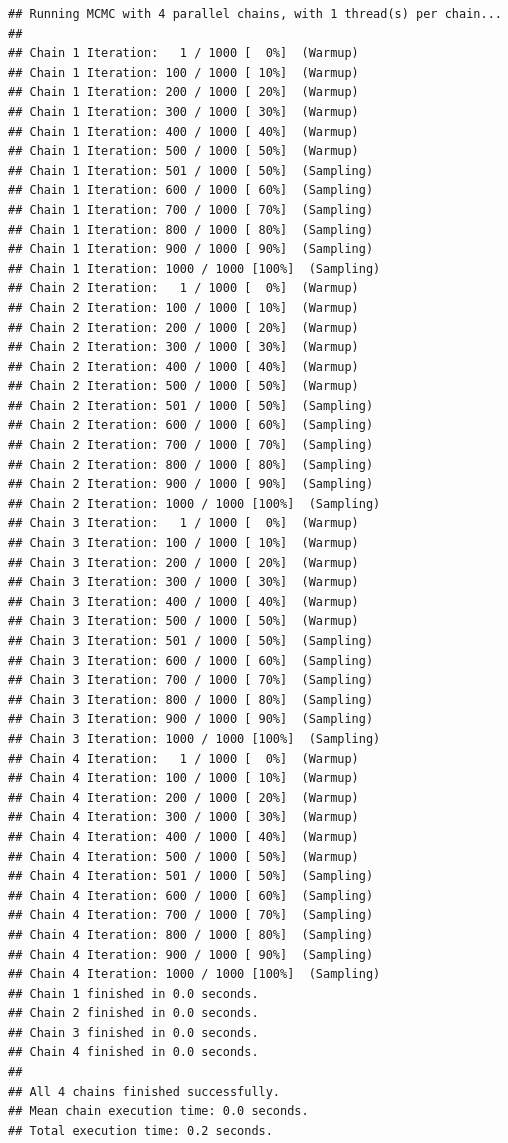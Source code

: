 \documentclass[
]{article}
\begin{document}
\begin{verbatim}
## Running MCMC with 4 parallel chains, with 1 thread(s) per chain...
## 
## Chain 1 Iteration:   1 / 1000 [  0%]  (Warmup) 
## Chain 1 Iteration: 100 / 1000 [ 10%]  (Warmup) 
## Chain 1 Iteration: 200 / 1000 [ 20%]  (Warmup) 
## Chain 1 Iteration: 300 / 1000 [ 30%]  (Warmup) 
## Chain 1 Iteration: 400 / 1000 [ 40%]  (Warmup) 
## Chain 1 Iteration: 500 / 1000 [ 50%]  (Warmup) 
## Chain 1 Iteration: 501 / 1000 [ 50%]  (Sampling) 
## Chain 1 Iteration: 600 / 1000 [ 60%]  (Sampling) 
## Chain 1 Iteration: 700 / 1000 [ 70%]  (Sampling) 
## Chain 1 Iteration: 800 / 1000 [ 80%]  (Sampling) 
## Chain 1 Iteration: 900 / 1000 [ 90%]  (Sampling) 
## Chain 1 Iteration: 1000 / 1000 [100%]  (Sampling) 
## Chain 2 Iteration:   1 / 1000 [  0%]  (Warmup) 
## Chain 2 Iteration: 100 / 1000 [ 10%]  (Warmup) 
## Chain 2 Iteration: 200 / 1000 [ 20%]  (Warmup) 
## Chain 2 Iteration: 300 / 1000 [ 30%]  (Warmup) 
## Chain 2 Iteration: 400 / 1000 [ 40%]  (Warmup) 
## Chain 2 Iteration: 500 / 1000 [ 50%]  (Warmup) 
## Chain 2 Iteration: 501 / 1000 [ 50%]  (Sampling) 
## Chain 2 Iteration: 600 / 1000 [ 60%]  (Sampling) 
## Chain 2 Iteration: 700 / 1000 [ 70%]  (Sampling) 
## Chain 2 Iteration: 800 / 1000 [ 80%]  (Sampling) 
## Chain 2 Iteration: 900 / 1000 [ 90%]  (Sampling) 
## Chain 2 Iteration: 1000 / 1000 [100%]  (Sampling) 
## Chain 3 Iteration:   1 / 1000 [  0%]  (Warmup) 
## Chain 3 Iteration: 100 / 1000 [ 10%]  (Warmup) 
## Chain 3 Iteration: 200 / 1000 [ 20%]  (Warmup) 
## Chain 3 Iteration: 300 / 1000 [ 30%]  (Warmup) 
## Chain 3 Iteration: 400 / 1000 [ 40%]  (Warmup) 
## Chain 3 Iteration: 500 / 1000 [ 50%]  (Warmup) 
## Chain 3 Iteration: 501 / 1000 [ 50%]  (Sampling) 
## Chain 3 Iteration: 600 / 1000 [ 60%]  (Sampling) 
## Chain 3 Iteration: 700 / 1000 [ 70%]  (Sampling) 
## Chain 3 Iteration: 800 / 1000 [ 80%]  (Sampling) 
## Chain 3 Iteration: 900 / 1000 [ 90%]  (Sampling) 
## Chain 3 Iteration: 1000 / 1000 [100%]  (Sampling) 
## Chain 4 Iteration:   1 / 1000 [  0%]  (Warmup) 
## Chain 4 Iteration: 100 / 1000 [ 10%]  (Warmup) 
## Chain 4 Iteration: 200 / 1000 [ 20%]  (Warmup) 
## Chain 4 Iteration: 300 / 1000 [ 30%]  (Warmup) 
## Chain 4 Iteration: 400 / 1000 [ 40%]  (Warmup) 
## Chain 4 Iteration: 500 / 1000 [ 50%]  (Warmup) 
## Chain 4 Iteration: 501 / 1000 [ 50%]  (Sampling) 
## Chain 4 Iteration: 600 / 1000 [ 60%]  (Sampling) 
## Chain 4 Iteration: 700 / 1000 [ 70%]  (Sampling) 
## Chain 4 Iteration: 800 / 1000 [ 80%]  (Sampling) 
## Chain 4 Iteration: 900 / 1000 [ 90%]  (Sampling) 
## Chain 4 Iteration: 1000 / 1000 [100%]  (Sampling) 
## Chain 1 finished in 0.0 seconds.
## Chain 2 finished in 0.0 seconds.
## Chain 3 finished in 0.0 seconds.
## Chain 4 finished in 0.0 seconds.
## 
## All 4 chains finished successfully.
## Mean chain execution time: 0.0 seconds.
## Total execution time: 0.2 seconds.
\end{verbatim}
\end{document}
